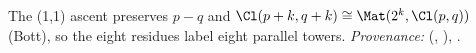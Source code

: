 The (1,1) ascent preserves $p - q$ and $\Cl(p+k, q+k) \cong \Mat(2^{k}, \Cl(p,q))$ (Bott), so the eight residues label eight parallel towers. \emph{Provenance:} \cite[Thms.~3.2, 3.6, Rem.~3.7]{ButlerT3} (, ), \cite[\S7]{ButlerT1}.
